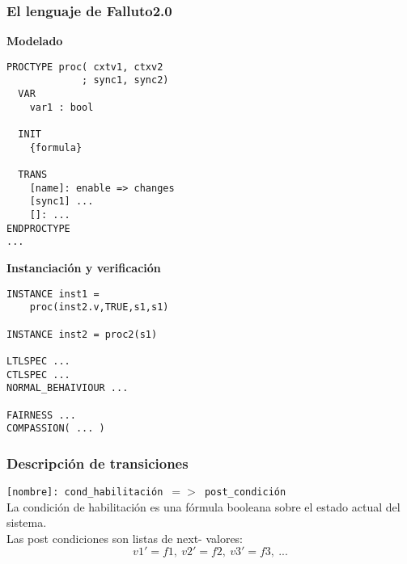 \documentclass[serif]{beamer}
\begin{document}
\begin{frame}[fragile]
\frametitle{El lenguaje de Falluto2.0}
{\fontsize{8pt}{10pt}\selectfont
\begin{minipage}{0.5\textwidth}
{\large \bfseries Modelado}
\begin{framed} 
\begin{verbatim}
PROCTYPE proc( cxtv1, ctxv2 
             ; sync1, sync2)
  VAR
    var1 : bool
   
  INIT
    {formula}

  TRANS
    [name]: enable => changes
    [sync1] ...
    []: ...
ENDPROCTYPE
...
\end{verbatim}
\end{framed}
\end{minipage}
\hspace{0.04\textwidth}
\begin{minipage}{0.44\textwidth}
{\large \bfseries Instanciación y verificación}
\begin{framed}
\begin{verbatim}
INSTANCE inst1 =
    proc(inst2.v,TRUE,s1,s1)

INSTANCE inst2 = proc2(s1)

LTLSPEC ...
CTLSPEC ...
NORMAL_BEHAIVIOUR ...

FAIRNESS ...
COMPASSION( ... )

\end{verbatim}
\end{framed}
\end{minipage}
} %

\end{frame}



\begin{frame}
\frametitle{Descripción de transiciones}
\texttt{[nombre]: cond\_habilitación $=>$ post\_condición}\\[0.5cm]
La condición de habilitación es una fórmula
booleana sobre el estado actual del sistema.\\[0.5cm]
Las post condiciones son listas de next-
valores: $$v1' = f1,~v2' = f2,~v3' = f3,~...$$
\end{frame}
\end{document}
